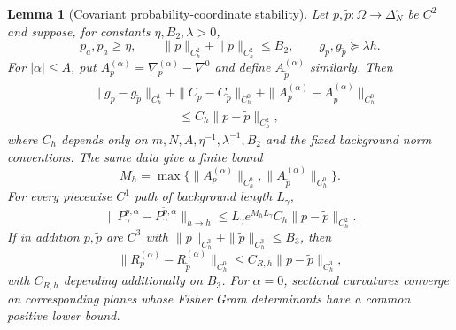 \documentclass[11pt]{article}
\newtheorem{lemma}[theorem]{Lemma}
\theoremstyle{definition}
\theoremstyle{remark}
\newcommand{\simplex}{\Delta_{N}^{\circ}}
\begin{document}
\begin{lemma}[Covariant probability-coordinate stability]\label{lem:chart-transfer}
Let $p,\widetilde p:\Omega\to\simplex$ be $C^2$ and suppose, for constants
$\eta,B_2,\lambda>0$,
\begin{equation}
  p_a,\widetilde p_a\ge\eta,\qquad
  \|p\|_{C^2_h}+\|\widetilde p\|_{C^2_h}\le B_2,\qquad
  g_p,g_{\widetilde p}\succeq\lambda h.
\end{equation}
For $|\alpha|\le A$, put
$A_p^{(\alpha)}=\nabla_p^{(\alpha)}-\nabla^0$ and define
$A_{\widetilde p}^{(\alpha)}$ similarly. Then
\begin{equation}
\begin{split}
  &\|g_p-g_{\widetilde p}\|_{C^1_h}
   +\|C_p-C_{\widetilde p}\|_{C^0_h}
   +\|A_p^{(\alpha)}-A_{\widetilde p}^{(\alpha)}\|_{C^0_h}\\
  &\hspace{7em}\le
  C_h\|p-\widetilde p\|_{C^2_h},
  \label{eq:covariant-probability-stability}
\end{split}
\end{equation}
where $C_h$ depends only on
$m,N,A,\eta^{-1},\lambda^{-1},B_2$ and the fixed background norm conventions.
The same data give a finite bound
\begin{equation}
  M_h=\max\{\|A_p^{(\alpha)}\|_{C^0_h},
             \|A_{\widetilde p}^{(\alpha)}\|_{C^0_h}\}.
\end{equation}
For every piecewise $C^1$ path of background length $L_\gamma$,
\begin{equation}
  \|P_\gamma^{p,\alpha}-P_\gamma^{\widetilde p,\alpha}\|_{h\to h}
  \le L_\gamma e^{M_hL_\gamma}C_h
       \|p-\widetilde p\|_{C^2_h}.
  \label{eq:covariant-probability-transport}
\end{equation}
If in addition $p,\widetilde p$ are $C^3$ with
$\|p\|_{C^3_h}+\|\widetilde p\|_{C^3_h}\le B_3$, then
\begin{equation}
  \|R_p^{(\alpha)}-R_{\widetilde p}^{(\alpha)}\|_{C^0_h}
  \le C_{R,h}\|p-\widetilde p\|_{C^3_h},
  \label{eq:covariant-curvature-stability}
\end{equation}
with $C_{R,h}$ depending additionally on $B_3$. For $\alpha=0$, sectional
curvatures converge on corresponding planes whose Fisher Gram determinants
have a common positive lower bound.
\end{lemma}
\end{document}
